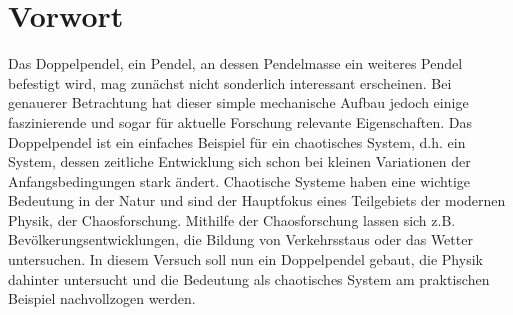 \section{Vorwort}
Das Doppelpendel, ein Pendel, an dessen Pendelmasse ein weiteres Pendel befestigt wird, mag zunächst nicht sonderlich interessant erscheinen. Bei genauerer Betrachtung hat dieser simple mechanische Aufbau jedoch einige faszinierende und sogar für aktuelle Forschung relevante Eigenschaften. Das Doppelpendel ist ein einfaches Beispiel für ein chaotisches System, d.h. ein System, dessen zeitliche Entwicklung sich schon bei kleinen Variationen der Anfangsbedingungen stark ändert. Chaotische Systeme haben eine wichtige Bedeutung in der Natur und sind der Hauptfokus eines Teilgebiets der modernen Physik, der Chaosforschung. Mithilfe der Chaosforschung lassen sich z.B. Bevölkerungsentwicklungen, die Bildung von Verkehrsstaus oder das Wetter untersuchen.
In diesem Versuch soll nun ein Doppelpendel gebaut, die Physik dahinter untersucht und die Bedeutung als chaotisches System am praktischen Beispiel nachvollzogen werden.